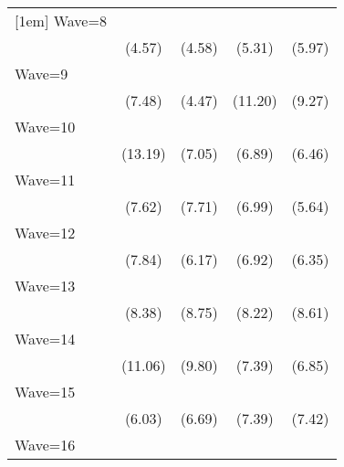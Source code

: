 {\begin{tabular}{l*{4}{c}}
[1em]
Wave=8              &            \sym{***}&            \sym{***}&            \sym{***}&            \sym{***}\\
                    &      (4.57)         &      (4.58)         &      (5.31)         &      (5.97)         \\
[1em]
Wave=9              &            \sym{***}&            \sym{***}&            \sym{***}&            \sym{***}\\
                    &      (7.48)         &      (4.47)         &     (11.20)         &      (9.27)         \\
[1em]
Wave=10             &            \sym{***}&            \sym{***}&            \sym{***}&            \sym{***}\\
                    &     (13.19)         &      (7.05)         &      (6.89)         &      (6.46)         \\
[1em]
Wave=11             &            \sym{***}&            \sym{***}&            \sym{***}&            \sym{***}\\
                    &      (7.62)         &      (7.71)         &      (6.99)         &      (5.64)         \\
[1em]
Wave=12             &            \sym{***}&            \sym{***}&            \sym{***}&            \sym{***}\\
                    &      (7.84)         &      (6.17)         &      (6.92)         &      (6.35)         \\
[1em]
Wave=13             &            \sym{***}&            \sym{***}&            \sym{***}&            \sym{***}\\
                    &      (8.38)         &      (8.75)         &      (8.22)         &      (8.61)         \\
[1em]
Wave=14             &            \sym{***}&            \sym{***}&            \sym{***}&            \sym{***}\\
                    &     (11.06)         &      (9.80)         &      (7.39)         &      (6.85)         \\
[1em]
Wave=15             &            \sym{***}&            \sym{***}&            \sym{***}&            \sym{***}\\
                    &      (6.03)         &      (6.69)         &      (7.39)         &      (7.42)         \\
[1em]
Wave=16             &            \sym{***}&            \sym{***}&            \sym{***}&            \sym{***}\\

\end{tabular}}
